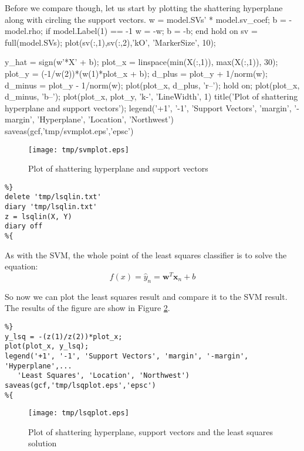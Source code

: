\documentclass[11pt, twoside]{article}   	%
\newenvironment{matlab}{\comment}{\endcomment}
\begin{document}
Before we compare though, let us start by plotting the shattering
hyperplane along with circling the support vectors. 
\begin{matlab}
w = model.SVs' * model.sv_coef;
b = -model.rho;
if model.Label(1) == -1
  w = -w;
  b = -b;
end
hold on 
sv = full(model.SVs);
plot(sv(:,1),sv(:,2),'kO', 'MarkerSize', 10);

y_hat = sign(w'*X' + b);
plot_x = linspace(min(X(:,1)), max(X(:,1)), 30);
plot_y = (-1/w(2))*(w(1)*plot_x + b);
d_plus = plot_y + 1/norm(w); 
d_minus = plot_y - 1/norm(w);
plot(plot_x, d_plus, 'r--'); 
hold on; 
plot(plot_x, d_minus, 'b--'); 
plot(plot_x, plot_y, 'k-', 'LineWidth', 1)
title('Plot of shattering hyperplane and support vectors'); 
legend('+1', '-1', 'Support Vectors', 'margin', '-margin', 'Hyperplane', 'Location', 'Northwest')
saveas(gcf,'tmp/svmplot.eps','epsc')

\end{matlab}

\begin{figure}[h]
\centering
\texttt{[image: tmp/svmplot.eps]}
\caption{Plot of shattering hyperplane and support vectors}
\label{fig:svm} 
\end{figure}

\begin{lstlisting}
%}
delete 'tmp/lsqlin.txt'
diary 'tmp/lsqlin.txt'
z = lsqlin(X, Y)  
diary off
%{
\end{lstlisting}

\color{lightgray}
\color{black}

As with the SVM, the whole point of the least squares classifier
is to solve the equation: 
\begin{equation}
f(x) = \hat{y}_n = \bm{w}^T\bm{x}_n + b
\end{equation}

So now we can plot the least squares result and compare it to the SVM
result. The results of the figure are show in Figure \ref{fig:lsq}. 
\begin{lstlisting}
%}
y_lsq = -(z(1)/z(2))*plot_x; 
plot(plot_x, y_lsq); 
legend('+1', '-1', 'Support Vectors', 'margin', '-margin', 'Hyperplane',...
   'Least Squares', 'Location', 'Northwest')
saveas(gcf,'tmp/lsqplot.eps','epsc')
%{
\end{lstlisting}

\begin{figure}[h]
\centering
\texttt{[image: tmp/lsqplot.eps]}
\caption{Plot of shattering hyperplane, support vectors and the least
squares solution}
\label{fig:lsq} 
\end{figure}
\end{document}
